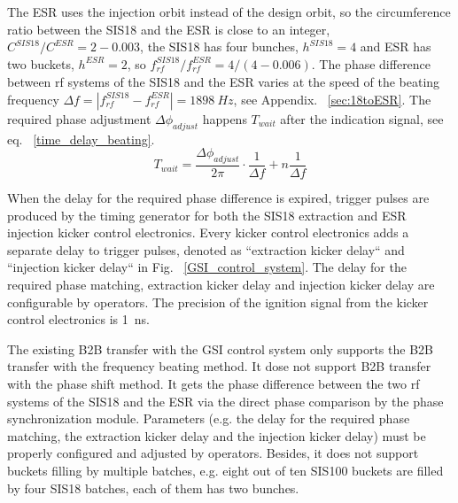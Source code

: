 The ESR uses the injection orbit instead of the design orbit, so the circumference ratio between the SIS18 and the ESR is close to an integer, $C^{\mathit{SIS18}}/C^{\mathit{ESR}}=2-0.003$, the SIS18 has four bunches, $h^{\mathit{SIS18}}=4$ and ESR has two buckets, $h^{\mathit{ESR}}=2$, so $f^{\mathit{SIS18}}_{\mathit{rf}}/f^{\mathit{ESR}}_{\mathit{rf}}=4/(4-0.006)$. The phase difference between rf systems of the SIS18 and the ESR varies at the speed of the beating frequency $\Delta f=|f^{\mathit{SIS18}}_{\mathit{rf}}-f^{\mathit{ESR}}_{\mathit{rf}}|=\SI{1898}{Hz}$, see Appendix. ~\ref{sec:18toESR}. The required phase adjustment $\Delta\phi_\mathit{adjust}$ happens $T_\mathit{wait}$ after the indication signal, see eq. ~\ref{time_delay_beating}. 
\begin{equation}
T_\mathit{wait}= \frac{\Delta \phi_\mathit{adjust}}{2\pi}\cdot\frac{1}{\Delta f}+n\frac{1}{\Delta f}\label{time_delay_beating}
\end{equation}

When the delay for the required phase difference is expired, trigger pulses are produced by the timing generator for both the SIS18 extraction and ESR injection kicker control electronics. Every kicker control electronics adds a separate delay to trigger pulses, denoted as ``extraction kicker delay`` and ``injection kicker delay`` in Fig. ~\ref{GSI_control_system}. The delay for the required phase matching, extraction kicker delay and injection kicker delay are configurable by operators. The precision of the ignition signal from the kicker control electronics is \SI{1}{ns}. 

The existing B2B transfer with the GSI control system only supports the B2B transfer with the frequency beating method. It dose not support B2B transfer with the phase shift method. It gets the phase difference between the two rf systems of the SIS18 and the ESR via the direct phase comparison by the phase synchronization module. Parameters (e.g. the delay for the required phase matching, the extraction kicker delay and the injection kicker delay) must be properly configured and adjusted by operators. Besides, it does not support buckets filling by multiple batches, e.g. eight out of ten SIS100 buckets are filled by four SIS18 batches, each of them has two bunches.

